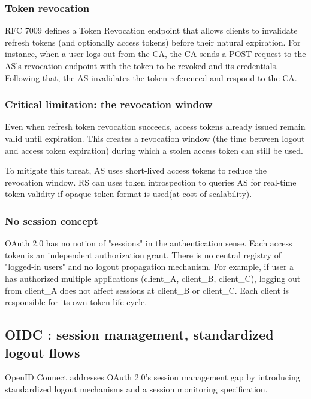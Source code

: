 \documentclass[../memoire.tex]{subfiles}
\begin{document}
\subsubsection*{Token revocation}

RFC 7009 defines a Token Revocation endpoint that allows clients to invalidate refresh tokens (and optionally access tokens) before their natural expiration. For instance, when a user logs out from the CA, the CA sends a POST request to the AS's revocation endpoint with the token to be revoked and its credentials. Following that, the AS invalidates the token referenced and respond to the CA.

\subsubsection*{Critical limitation: the revocation window}

Even when refresh token revocation succeeds, access tokens already issued remain valid until expiration. This creates a revocation window (the time between logout and access token expiration) during which a stolen access token can still be used.

To mitigate this threat, AS uses short-lived access tokens to reduce the revocation window. RS can uses token introspection to queries AS for real-time token validity if opaque token format is used(at cost of scalability).

\subsubsection*{No session concept}

OAuth 2.0 has no notion of "sessions" in the authentication sense. Each access token is an independent authorization grant. There is no central registry of "logged-in users" and no logout propagation mechanism. For example, if user a has authorized multiple applications (client\_A, client\_B, client\_C), logging out from client\_A does not affect sessions at client\_B or client\_C. Each client is responsible for its own token life cycle.

\subsection{OIDC : session management, standardized logout flows}

OpenID Connect addresses OAuth 2.0's session management gap by introducing standardized logout mechanisms and a session monitoring specification\cite{iframe_logout}\cite[p.~301, p.~202]{richer2017}. 
\end{document}
